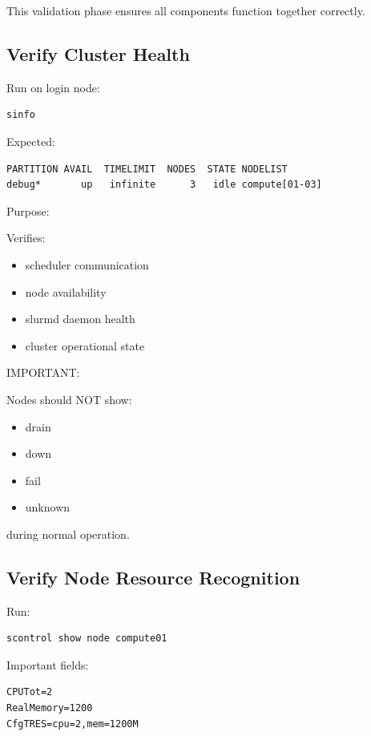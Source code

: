\documentclass[11pt]{article}
\begin{document}
This validation phase ensures all components function together correctly.
\subsection{Verify Cluster Health}
\label{sec:org2bf81f0}

Run on login node:

\begin{verbatim}
sinfo
\end{verbatim}

Expected:

\begin{verbatim}
PARTITION AVAIL  TIMELIMIT  NODES  STATE NODELIST
debug*       up   infinite      3   idle compute[01-03]
\end{verbatim}

Purpose:

Verifies:

\begin{itemize}
\item scheduler communication
\item node availability
\item slurmd daemon health
\item cluster operational state
\end{itemize}

IMPORTANT:

Nodes should NOT show:

\begin{itemize}
\item drain
\item down
\item fail
\item unknown
\end{itemize}

during normal operation.
\subsection{Verify Node Resource Recognition}
\label{sec:orgf000133}

Run:

\begin{verbatim}
scontrol show node compute01
\end{verbatim}

Important fields:

\begin{verbatim}
CPUTot=2
RealMemory=1200
CfgTRES=cpu=2,mem=1200M
\end{verbatim}
\end{document}

